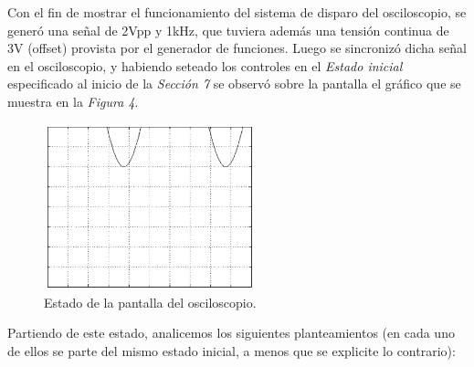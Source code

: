 \documentclass{article}
\begin{document}
	Con el fin de mostrar el funcionamiento del sistema de disparo del osciloscopio, se generó una señal de 2Vpp y 1kHz, que tuviera además una tensión continua de 3V (offset) provista por el generador de funciones. Luego se sincronizó dicha señal en el osciloscopio, y habiendo seteado los controles en el \textit{Estado inicial} especificado al inicio de la \textit{Sección 7} se observó sobre la pantalla el gráfico que se muestra en la \textit{Figura 4}.


\newpage
\begin{figure}[h]
	\centering
	\includegraphics[width=0.542\textwidth]{images/04-modo-normal-y-auto.jpg}
	\medskip
	\caption{Estado de la pantalla del osciloscopio.}
\end{figure}
\bigskip\bigskip\bigskip


	Partiendo de este estado, analicemos los siguientes planteamientos (en cada uno de ellos se parte del mismo estado inicial, a menos que se explicite lo contrario):
\bigskip\smallskip
\end{document}
